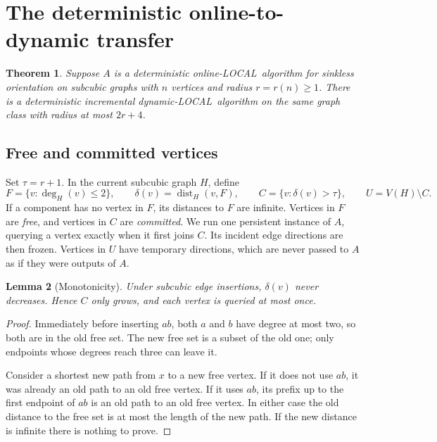 \documentclass[11pt]{article}
\newtheorem{theorem}{Theorem}[section]
\newtheorem{lemma}[theorem]{Lemma}
\theoremstyle{definition}
\newcommand{\dist}{\operatorname{dist}}
\newcommand{\Dyn}{\textnormal{dynamic-LOCAL}}
\newcommand{\On}{\textnormal{online-LOCAL}}
\begin{document}
\section{The deterministic online-to-dynamic transfer}\label{sec:transfer}

\begin{theorem}\label{thm:transfer}
Suppose $A$ is a deterministic \On\ algorithm for sinkless orientation on
subcubic graphs with $n$ vertices and radius $r=r(n)\ge1$. There is a
deterministic incremental \Dyn\ algorithm on the same graph class with
radius at most $2r+4$.
\end{theorem}

\subsection{Free and committed vertices}

Set $\tau=r+1$. In the current subcubic graph $H$, define
\begin{equation}\label{eq:sets}
 F=\{v:\deg_H(v)\le2\},\qquad
 \delta(v)=\dist_H(v,F),\qquad
 C=\{v:\delta(v)>\tau\},\qquad U=V(H)\setminus C.
\end{equation}
If a component has no vertex in $F$, its distances to $F$ are infinite.
Vertices in $F$ are \emph{free}, and vertices in $C$ are \emph{committed}.
We run one persistent instance of $A$, querying a vertex exactly when it
first joins $C$. Its incident edge directions are then frozen. Vertices in
$U$ have temporary directions, which are never passed to $A$ as if they
were outputs of $A$.

\begin{lemma}[Monotonicity]\label{lem:monotonicity}
Under subcubic edge insertions, $\delta(v)$ never decreases. Hence $C$ only
grows, and each vertex is queried at most once.
\end{lemma}
\begin{proof}
Immediately before inserting $ab$, both $a$ and $b$ have degree at most two,
so both are in the old free set. The new free set is a subset of the old
one; only endpoints whose degrees reach three can leave it.

Consider a shortest new path from $x$ to a new free vertex. If it does not
use $ab$, it was already an old path to an old free vertex. If it uses $ab$,
its prefix up to the first endpoint of $ab$ is an old path to an old free
vertex. In either case the old distance to the free set is at most the
length of the new path. If the new distance is infinite there is nothing
to prove.
\end{proof}
\end{document}
